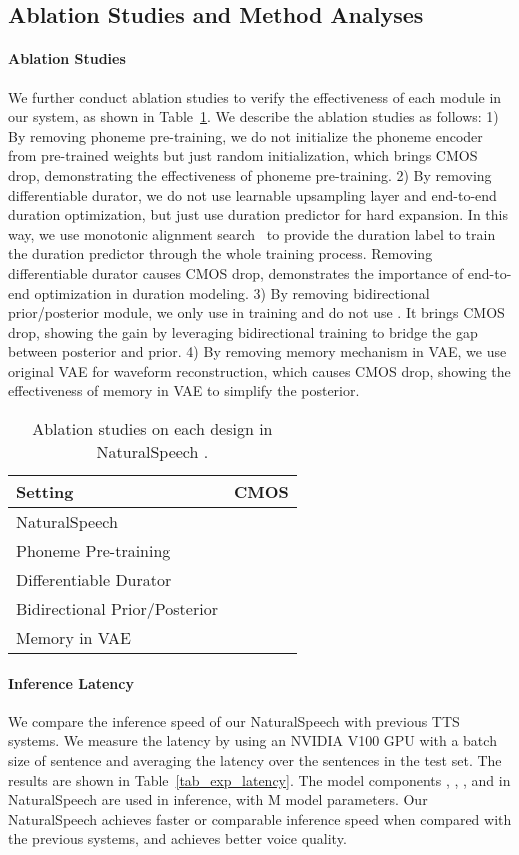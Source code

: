 \documentclass{article}
\theoremstyle{definition}
\def\myname{NaturalSpeech}
\begin{document}
\subsection{Ablation Studies and Method Analyses}
\paragraph{Ablation Studies} We further conduct ablation studies to verify the effectiveness of each module in our system, as shown in Table~\ref{tab_cmos_ablation}. We describe the ablation studies as follows: 1) By removing phoneme pre-training, we do not initialize the phoneme encoder from pre-trained weights but just random initialization, which brings  CMOS drop, demonstrating the effectiveness of phoneme pre-training. 2) By removing differentiable durator, we do not use learnable upsampling layer and end-to-end duration optimization, but just use duration predictor for hard expansion. In this way, we use monotonic alignment search~\citep{kim2020glow} to provide the duration label to train the duration predictor through the whole training process. Removing differentiable durator causes  CMOS drop, demonstrates the importance of end-to-end optimization in duration modeling. 3) By removing bidirectional prior/posterior module, we only use  in training and do not use . It brings  CMOS drop, showing the gain by leveraging bidirectional training to bridge the gap between posterior and prior. 4) By removing memory mechanism in VAE, we use original VAE for waveform reconstruction, which causes  CMOS drop, showing the effectiveness of memory in VAE to simplify the posterior. 



\begin{table}[h!]
	\caption{Ablation studies on each design in \myname{} .}
	\centering
	\begin{tabular}{ l c}
		\toprule
	    Setting & CMOS \\
	    \midrule
		\myname{}  &  \\
		 Phoneme Pre-training &  \\
		 Differentiable Durator & \\
		 Bidirectional Prior/Posterior &  \\
		 Memory in VAE &  \\
		\bottomrule
	\end{tabular}
	\label{tab_cmos_ablation}
\end{table}


\paragraph{Inference Latency}
We compare the inference speed of our \myname{} with previous TTS systems. We measure the latency by using an NVIDIA V100 GPU with a batch size of  sentence and averaging the latency over the sentences in the test set. The results are shown in Table~\ref{tab_exp_latency}. The model components , , , and  in \myname{} are used in inference, with M model parameters. Our \myname{} achieves faster or comparable inference speed when compared with the previous systems, and achieves better voice quality.
\end{document}
